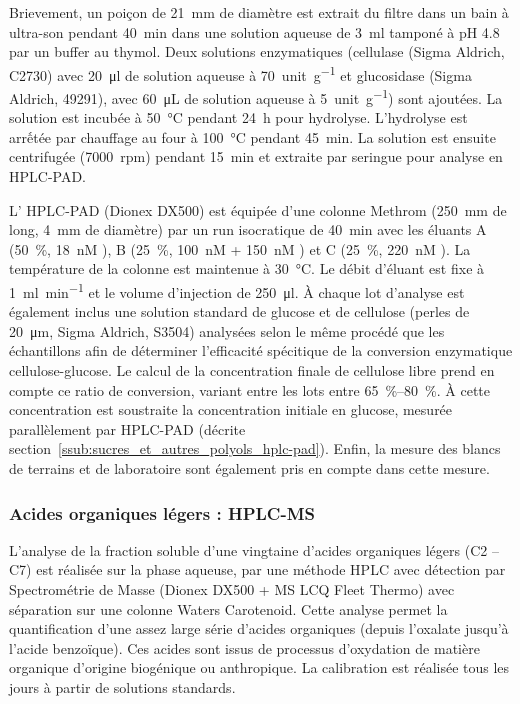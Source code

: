 Brievement, un poiçon de \SI{21}{\mm} de diamètre est extrait du filtre dans un bain à
ultra-son pendant \SI{40}{\minute} dans une solution aqueuse de \SI{3}{\ml} tamponé à pH
4.8 par un buffer au thymol. Deux solutions enzymatiques (cellulase (Sigma Aldrich, C2730)
avec \SI{20}{\ul} de solution aqueuse à \SI{70}{unit.\g^{-1}} et glucosidase (Sigma
Aldrich, 49291), avec \SI{60}{\micro\L} de solution aqueuse à \SI{5}{unit.\g^{-1}}) sont
ajoutées. La solution est incubée à \SI{50}{\degreeCelsius} pendant \SI{24}{h} pour
hydrolyse. L'hydrolyse est arrếtée par chauffage au four à \SI{100}{\degreeCelsius}
pendant \SI{45}{min}. La solution est ensuite centrifugée (\SI{7000}{rpm}) pendant
\SI{15}{min} et extraite par seringue pour analyse en HPLC-PAD.

L' HPLC-PAD (Dionex DX500) est équipée d'une colonne Methrom (\SI{250}{mm} de long,
\SI{4}{mm} de diamètre) par un run isocratique de \SI{40}{min} avec les éluants 
A (\SI{50}{\percent}, \SI{18}{nM} ), B (\SI{25}{\percent}, \SI{100}{nM}  + \SI{150}{nM}
) et C (\SI{25}{\percent}, \SI{220}{nM} ). La température de la colonne
est maintenue à \SI{30}{\degreeCelsius}. Le débit d'éluant est fixe à
\SI{1}{\ml\per\minute} et le volume d'injection de \SI{250}{\ul}.
À chaque lot d'analyse est également inclus une solution standard de glucose et de
cellulose (perles de \SI{20}{\um}, Sigma Aldrich, S3504) analysées selon le même
procédé que les échantillons afin de déterminer l'efficacité spécitique de la conversion
enzymatique cellulose-glucose. Le calcul de la concentration finale de cellulose libre
prend en compte ce ratio de conversion, variant entre les lots entre
\SIrange{65}{80}{\percent}.
À cette concentration est soustraite la concentration initiale en glucose, mesurée
parallèlement par HPLC-PAD (décrite section~\ref{ssub:sucres_et_autres_polyols_hplc-pad}).
Enfin, la mesure des blancs de terrains et de laboratoire sont également pris en compte
dans cette mesure.

\subsubsection{Acides organiques légers : HPLC-MS}%
\label{ssub:acides_organiques_légers_hplc_ms}

L’analyse de la fraction soluble d’une vingtaine d’acides organiques légers (C2 – C7) est
réalisée sur la phase aqueuse, par une méthode HPLC avec détection par Spectrométrie de
Masse (Dionex DX500 + MS LCQ Fleet Thermo) avec séparation sur une colonne Waters
Carotenoid. Cette analyse permet la quantification d’une assez large série d'acides
organiques (depuis l’oxalate jusqu’à l’acide benzoïque). Ces acides sont issus de
processus d’oxydation de matière organique d’origine biogénique ou anthropique. La
calibration est réalisée tous les jours à partir de solutions standards.

